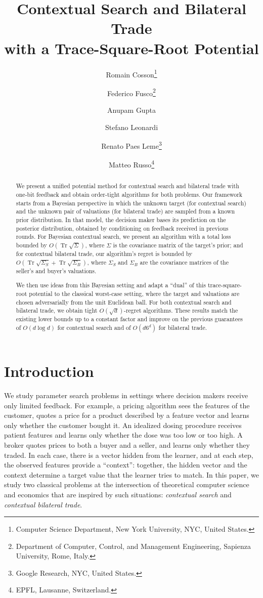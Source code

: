 \documentclass[11pt]{article}
\title{Contextual Search and Bilateral Trade\\ with a Trace-Square-Root Potential}
\author{Romain Cosson\thanks{Computer Science Department, New York University, NYC, United States.}
\and Federico Fusco\thanks{Department of Computer, Control, and Management Engineering, Sapienza University, Rome, Italy.}
\and Anupam Gupta\footnotemark[1] \footnotemark[3]
\and Stefano Leonardi\footnotemark[2]
\and Renato Paes Leme\thanks{Google Research, NYC, United States.}
\and Matteo Russo\thanks{EPFL, Lausanne, Switzerland.}}
\date{}
\DeclareMathOperator{\Tr}{Tr}
\begin{document}
\maketitle
\begin{abstract}
We present a unified potential method for contextual search and bilateral trade with one-bit feedback and obtain order-tight algorithms for both problems.
Our framework starts from a Bayesian perspective in which the unknown target (for contextual search) and the unknown pair of valuations (for bilateral trade) are sampled from a known prior distribution.
In that model, the decision maker bases its prediction on the posterior distribution, obtained by conditioning on feedback received in previous rounds. 
For Bayesian contextual search, we present an algorithm with a {total loss bounded by} $O(\Tr \sqrt \Sigma)${, where} $\Sigma$ is the covariance matrix of the target's prior; 
and for contextual bilateral trade, our algorithm's regret is bounded by $O(\Tr \sqrt{\Sigma_S}+\Tr \sqrt{\Sigma_B})$, where $\Sigma_S$ and $\Sigma_B$ are the covariance matrices of the seller's and buyer's valuations. 

We then use ideas from this Bayesian setting and adapt a ``dual'' of this trace-square-root potential to the classical worst-case setting, where the target and valuations are chosen adversarially from the unit Euclidean ball. For both contextual search and bilateral trade, we obtain tight $O(\sqrt d)$-regret algorithms. These results match the existing lower bounds up to a constant {factor and improve on} the previous guarantees of $O(d\log d)$ for contextual {search and} of $O(d6^d)$ for bilateral trade. 
\end{abstract}
\thispagestyle{empty}

\newpage
{}


\section{Introduction}\label{sec:intro}

We study parameter search problems in settings where decision makers
receive only limited feedback. For example, a pricing algorithm sees
the features of the customer, quotes a price for a product described
by a feature vector and learns only whether the customer bought it. An
idealized dosing procedure receives {patient features and learns} only
whether the dose was too low or too high. A broker quotes prices to
both a buyer and a seller, and learns only whether they traded. In
each case, there is a vector hidden from the learner, and {at each step,
the observed features provide a ``context'': together, the hidden vector
and the context determine a target value that the learner tries to match.} In this paper, we study two classical
problems at the intersection of theoretical computer science and
economics that are inspired by such situations: \textit{contextual
  search} and \textit{contextual bilateral trade}.
\end{document}
